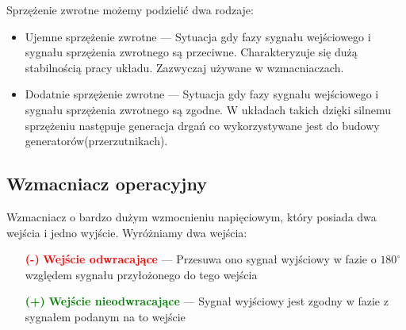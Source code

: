 \documentclass{article}
\begin{document}
      Sprzężenie zwrotne możemy podzielić dwa rodzaje:
      \begin{itemize}
        \item Ujemne sprzężenie zwrotne --- Sytuacja gdy fazy sygnału wejściowego i sygnału sprzężenia zwrotnego są przeciwne. Charakteryzuje się dużą stabilnością pracy układu. Zazwyczaj używane w wzmacniaczach.
        
        \item Dodatnie sprzężenie zwrotne --- Sytuacja gdy fazy sygnału wejściowego i sygnału sprzężenia zwrotnego są zgodne. W układach takich dzięki silnemu sprzężeniu następuje generacja drgań co wykorzystywane jest do budowy generatorów(przerzutnikach).
      \end{itemize}

    \subsection{Wzmacniacz operacyjny}
      Wzmacniacz o bardzo dużym wzmocnieniu napięciowym, który posiada dwa wejścia i jedno wyjście. Wyróżniamy dwa wejścia:
      \begin{enumerate}
        \item[\textcolor{red}{\textbf{(-)}}] \textcolor{red}{\textbf{Wejście odwracające}} --- Przesuwa ono sygnał wyjściowy w fazie o $180^\circ$ względem sygnału przyłożonego do tego wejścia
        \item[\textcolor{green}{\textbf{(+)}}] \textcolor{green}{\textbf{Wejście nieodwracające}} --- Sygnał wyjściowy jest zgodny w fazie z sygnałem podanym na to wejście
      \end{enumerate}
\end{document}
